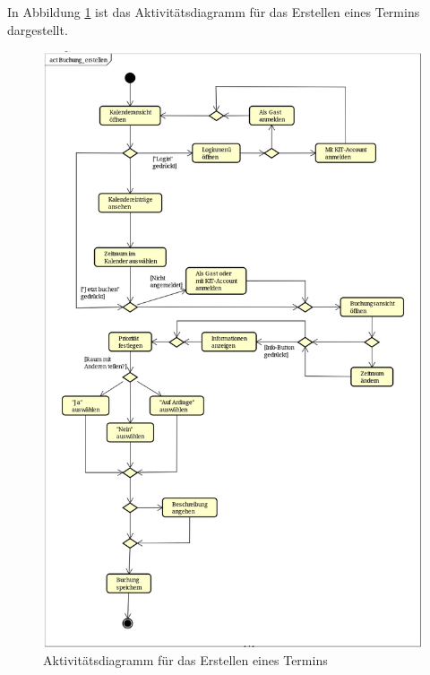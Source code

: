 In Abbildung \ref{fig:activity_diagram_booking} ist das Aktivitätsdiagramm für das Erstellen eines Termins dargestellt.
\begin{figure}[ht]
    \centering
    \includegraphics[scale=0.20]{figures/activitydiagrams/buchungerstellen}
    \caption{Aktivitätsdiagramm für das Erstellen eines Termins}
    \label{fig:activity_diagram_booking}
\end{figure}


\clearpage
